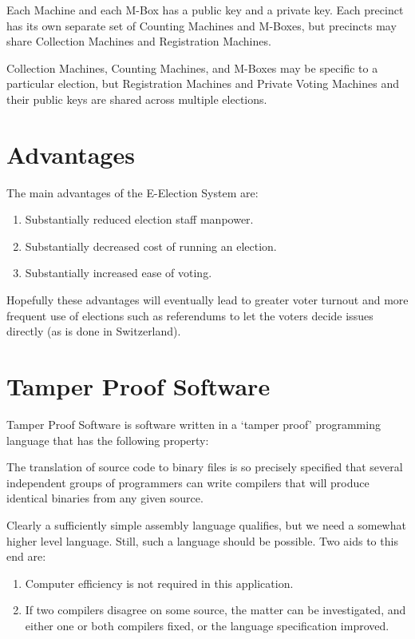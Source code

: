 \documentclass[12pt]{article}
\newenvironment{indpar}[1][0.3in]%
	{\begin{list}{}%
		     {\setlength{\itemsep}{0in}%
		      \setlength{\topsep}{0in}%
		      \setlength{\parsep}{1ex}%
		      \setlength{\labelwidth}{#1}%
		      \setlength{\leftmargin}{#1}%
		      \addtolength{\leftmargin}{\labelsep}}%
	 \item}%
	{\end{list}}
\begin{document}
Each Machine and each M-Box has a public key and a private key.
Each precinct has its own separate set of Counting Machines and M-Boxes,
but precincts may share Collection Machines and Registration
Machines.

Collection Machines,
Counting Machines, and M-Boxes may be
specific to a particular election, but Registration Machines
and Private Voting Machines and
their public keys are shared across multiple elections.

\section{Advantages}

The main advantages of the E-Election System are:
\begin{enumerate}
\item Substantially reduced election staff manpower.
\item Substantially decreased cost of running an election.
\item Substantially increased ease of voting.
\end{enumerate}

Hopefully these advantages will eventually lead to
greater voter turnout and more frequent use of elections such
as referendums to let the voters decide issues directly
(as is done in Switzerland).


\section{Tamper Proof Software}

Tamper Proof Software is software written in a `tamper proof'
programming language
that has the following property:
\begin{indpar}
The translation of source code to binary files is so precisely
specified that several independent groups of programmers can
write compilers that will produce identical binaries from any
given source.
\end{indpar}

Clearly a sufficiently simple assembly language qualifies, but
we need a somewhat higher level language.  Still, such a language
should be possible.  Two aids to this end are:
\begin{enumerate}
\item
Computer efficiency is not required in this application.

\item
If two compilers disagree on some source, the matter can be
investigated, and either one or both compilers fixed, or the
language specification improved.
\end{enumerate}
\end{document}
